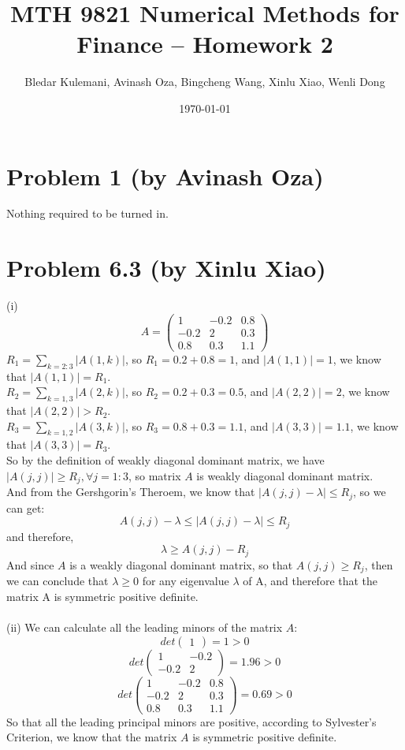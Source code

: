 \documentclass{article}
\title{MTH 9821 Numerical Methods for Finance -- Homework 2}
\author{Bledar Kulemani, Avinash Oza, Bingcheng Wang, Xinlu Xiao, Wenli Dong}
\date{\today}
\DeclareMathOperator{\1}{\mathit{1}}
\numberwithin{figure}{section} %
\numberwithin{table}{section}
\begin{document}
\maketitle

\section{Problem 1 (by Avinash Oza)}
Nothing required to be turned in.

\section{Problem 6.3 (by Xinlu Xiao)}

(i)\[
A = \left(
\begin{matrix}
1 & -0.2 & 0.8\\
-0.2 & 2 & 0.3\\
0.8 & 0.3 & 1.1
\end{matrix}\right)
\]
 $R_{1} = \sum_{k = 2:3} |A(1,k)|$,  so $R_{1} = 0.2 + 0.8 = 1$, and $|A(1,1)| = 1$, we know that $|A(1,1)| = R_{1}$.\\
$R_{2} = \sum_{k = 1, 3} |A(2,k)|$,  so $R_{2} = 0.2 + 0.3 = 0.5$, and $|A(2,2)| = 2$, we know that $|A(2,2)| > R_{2}$.\\
$R_{3} = \sum_{k = 1, 2} |A(3,k)|$,  so $R_{3} = 0.8 + 0.3 = 1.1$, and $|A(3,3)| = 1.1$, we know that $|A(3,3)| = R_{3}$.\\
So by the definition of weakly diagonal dominant matrix, we have $|A(j,j)| \geq R_{j}, \forall j = 1:3$, so matrix $A$ is weakly diagonal dominant matrix.\\
And from the Gershgorin's Theroem, we know that $|A(j,j)-\lambda| \leq R_{j}$, so we can get:
\[
A(j,j) - \lambda \leq |A(j,j)-\lambda| \leq R_{j} \]
and therefore,
\[
\lambda \geq A(j,j) - R_{j}\]
And since $A$ is a weakly diagonal dominant matrix, so that $A(j,j) \geq R_{j}$, then we can conclude that $\lambda \geq 0$ for any eigenvalue $\lambda$ of A, and therefore that the matrix A is symmetric positive definite.\\
\\
(ii) We can calculate all the leading minors of the matrix $A$:
\[
det\left(
\begin{matrix}
1
\end{matrix}\right) = 1 > 0
\]
\[
det\left(
\begin{matrix}
1 & -0.2\\
-0.2 & 2
\end{matrix}\right) = 1.96>0 \]
\[
det\left(
\begin{matrix}
1 & -0.2 & 0.8\\
-0.2 & 2 & 0.3\\
0.8 & 0.3 & 1.1
\end{matrix}\right) = 0.69 > 0\]
So that all the leading principal minors are positive, according to Sylvester's Criterion, we know that the matrix $A$ is symmetric positive definite.\\
\end{document}
